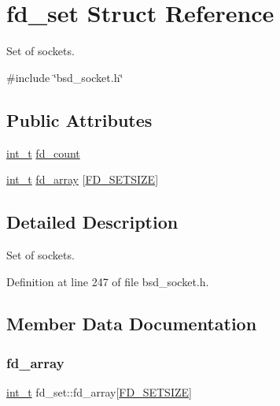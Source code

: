 \hypertarget{structfd__set}{}\section{fd\+\_\+set Struct Reference}
\label{structfd__set}


Set of sockets.  




{\ttfamily \#include \char`\"{}bsd\+\_\+socket.\+h\char`\"{}}

\subsection*{Public Attributes}
\begin{DoxyCompactItemize}
\item 
\hyperlink{compiler__port_8h_a022c65af7f6c8d3947e8a37d64db6ad6}{int\+\_\+t} \hyperlink{structfd__set_a7f64eb4ba04934ec80743cc4ecf006ec}{fd\+\_\+count}
\item 
\hyperlink{compiler__port_8h_a022c65af7f6c8d3947e8a37d64db6ad6}{int\+\_\+t} \hyperlink{structfd__set_abf0bd009091ff72addaa2396f8fe9d8c}{fd\+\_\+array} \mbox{[}\hyperlink{bsd__socket_8h_a86c5dbf5a99358e288f573d6a1e0873f}{F\+D\+\_\+\+S\+E\+T\+S\+I\+ZE}\mbox{]}
\end{DoxyCompactItemize}


\subsection{Detailed Description}
Set of sockets. 

Definition at line 247 of file bsd\+\_\+socket.\+h.



\subsection{Member Data Documentation}
\mbox{\label{structfd__set_abf0bd009091ff72addaa2396f8fe9d8c}} 
\subsubsection{\texorpdfstring{fd\+\_\+array}{fd\_array}}
{\footnotesize\ttfamily \hyperlink{compiler__port_8h_a022c65af7f6c8d3947e8a37d64db6ad6}{int\+\_\+t} fd\+\_\+set\+::fd\+\_\+array\mbox{[}\hyperlink{bsd__socket_8h_a86c5dbf5a99358e288f573d6a1e0873f}{F\+D\+\_\+\+S\+E\+T\+S\+I\+ZE}\mbox{]}}



